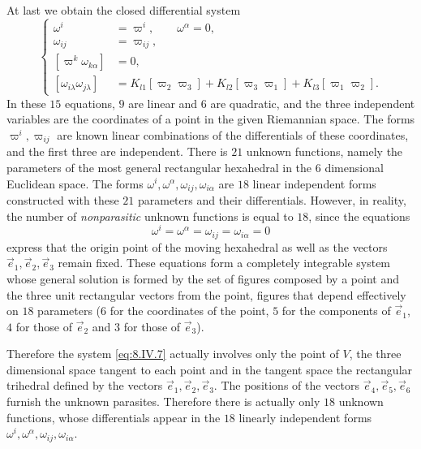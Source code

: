 \documentclass[leqno,11pt]{book}
\numberwithin{equation}{chapter}
\theoremstyle{shape1}
\theoremstyle{shape0}
\theoremstyle{shape2}
\theoremstyle{definition}
\begin{document}
At last we obtain the closed differential system
\begin{equation}
  \label{eq:8.IV.7}\tag{IV, 7}
  \left\{
    \begin{aligned}
      \omega^{i}&=\varpi^{i},\qquad\omega^{\alpha}=0,\\
      \omega_{ij}&=\varpi_{ij},\\
      [\varpi^{k}\omega_{k\alpha}]&=0,\\
      [\omega_{i\lambda}\omega_{j\lambda}]&=K_{l1}[\varpi_{2}\varpi_{3}]+K_{l2}[\varpi_{3}\varpi_{1}]+K_{l3}[\varpi_{1}\varpi_{2}].
    \end{aligned}
  \right.
\end{equation}
In these $15$ equations, $9$ are linear and $6$ are quadratic, and the three independent variables are the coordinates of a point in the given Riemannian space. The forms $\varpi^{i},\varpi_{ij}$ are known linear combinations of the differentials of these coordinates, and the first three are independent. There is $21$ unknown functions, namely the parameters of the most general rectangular hexahedral in the $6$ dimensional Euclidean space. The forms $\omega^{i},\omega^{\alpha},\omega_{ij},\omega_{i\alpha}$ are $18$ linear independent forms constructed with these $21$ parameters and their differentials. However, in reality, the number of \emph{nonparasitic} unknown functions is equal to $18$, since the equations
\[
\omega^{i}=\omega^{\alpha}=\omega_{ij}=\omega_{i\alpha}=0
\]
express that the origin point of the moving hexahedral as well as the vectors $\vec e_{1},\vec e_{2},\vec e_{3}$ remain fixed. These equations form a completely integrable system whose general solution is formed by the set of figures composed by a point and the three unit rectangular vectors from the point, figures that depend effectively on $18$ parameters ($6$ for the coordinates of the point, $5$ for the components of $\vec e_{1}$, $4$ for those of $\vec e_{2}$ and $3$ for those of $\vec e_{3}$).

Therefore the system \eqref{eq:8.IV.7}  actually involves only the point of $V$, the three dimensional space tangent to each point and in the tangent space the rectangular trihedral defined by the vectors $\vec e_{1},\vec e_{2},\vec e_{3}$. The positions of the vectors $\vec e_{4},\vec e_{5},\vec e_{6}$ furnish the unknown parasites. Therefore there is actually only $18$ unknown functions, whose differentials appear in the $18$ linearly independent forms $\omega^{i},\omega^{\alpha},\omega_{ij},\omega_{i\alpha}$.
\end{document}
